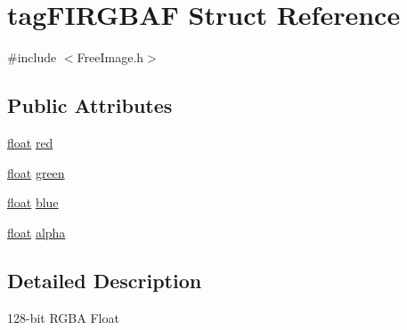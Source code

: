 \hypertarget{structtag_f_i_r_g_b_a_f}{\section{tag\-F\-I\-R\-G\-B\-A\-F Struct Reference}
\label{structtag_f_i_r_g_b_a_f}
}


{\ttfamily \#include $<$Free\-Image.\-h$>$}

\subsection*{Public Attributes}
\begin{DoxyCompactItemize}
\item 
\hyperlink{fmod_8h_aeb841aa4b4b5f444b5d739d865b420af}{float} \hyperlink{structtag_f_i_r_g_b_a_f_a59e5260e2f6e013661bc5d4775b18d9e}{red}
\item 
\hyperlink{fmod_8h_aeb841aa4b4b5f444b5d739d865b420af}{float} \hyperlink{structtag_f_i_r_g_b_a_f_ac4e284e0711fdba31b624cee92d85e2b}{green}
\item 
\hyperlink{fmod_8h_aeb841aa4b4b5f444b5d739d865b420af}{float} \hyperlink{structtag_f_i_r_g_b_a_f_a9c2e5ec45c4c33518fd4765f5fd04b01}{blue}
\item 
\hyperlink{fmod_8h_aeb841aa4b4b5f444b5d739d865b420af}{float} \hyperlink{structtag_f_i_r_g_b_a_f_a59da6fdc089e6ad1f8b2be601815f5cb}{alpha}
\end{DoxyCompactItemize}


\subsection{Detailed Description}
128-\/bit R\-G\-B\-A Float 

